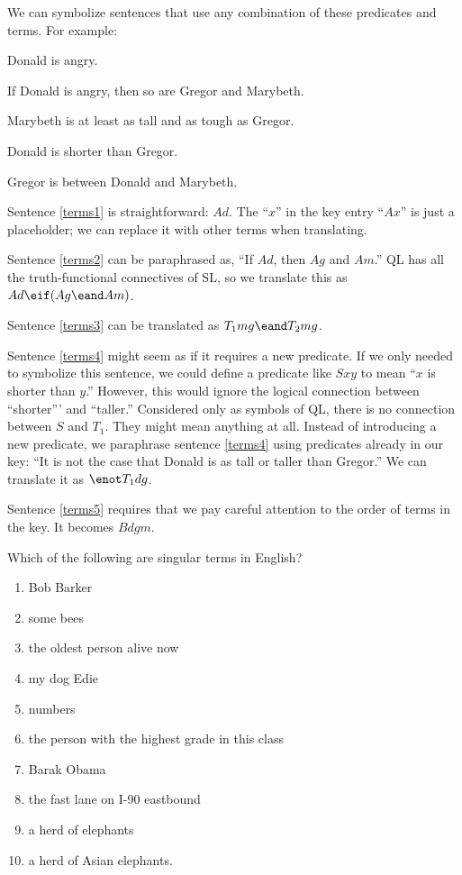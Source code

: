 We can symbolize sentences that use any combination of these predicates and terms. For example:
\begin{kormanize}
\item[\ex{terms1}] Donald is angry.
\item[\ex{terms2}] If Donald is angry, then so are Gregor and Marybeth.
\item[\ex{terms3}] Marybeth is at least as tall and as tough as Gregor.
\item[\ex{terms4}] Donald is shorter than Gregor.
\item[\ex{terms5}] Gregor is between Donald and Marybeth.
\end{kormanize}

Sentence \ref{terms1} is straightforward: $Ad$. The ``$x$'' in the key entry ``$Ax$'' is just a placeholder; we can replace it with other terms when translating.

Sentence \ref{terms2} can be paraphrased as, ``If $Ad$, then $Ag$ and $Am$.'' QL has all the truth-functional connectives of SL, so we translate this as $Ad \eif (Ag \eand Am)$.

Sentence \ref{terms3} can be translated as $T_1mg \eand T_2mg$.

Sentence \ref{terms4} might seem as if it requires a new predicate. If we only needed to symbolize this sentence, we could define a predicate like $Sxy$ to mean ``$x$ is shorter than $y$.'' However, this would ignore the logical connection between ``shorter''' and ``taller.'' Considered only as symbols of QL, there is no connection between $S$ and $T_1$. They might mean anything at all. Instead of introducing a new predicate, we paraphrase sentence \ref{terms4} using predicates already in our key: ``It is not the case that Donald is as tall or taller than Gregor.'' We can translate it as $\enot T_1dg$.

Sentence \ref{terms5} requires that we pay careful attention to the order of terms in the key. It becomes $Bdgm$.

\practiceproblems
\setlength{\parindent}{0em}

\problempart Which of the following are singular terms in English?

\begin{multicols}{2}
\begin{enumerate}[label=\arabic*)]
\item Bob Barker
\item some bees
\item the oldest person alive now
\item my dog Edie
\item numbers
\item the person with the highest grade in this class
\item Barak Obama
\item the fast lane on I-90 eastbound
\item a herd of elephants
\item a herd of Asian elephants.
\end{enumerate}
\end{multicols}

